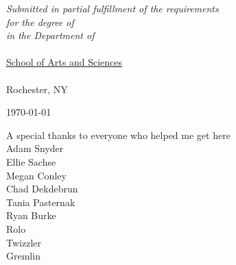\documentclass[
11pt, %
english, %
doublespacing, %
nolistspacing, %
headsepline, %
]{MastersDoctoralThesis} %
\begin{document}
\begin{titlepage}
\begin{singlespace}
\begin{center}
\vfill

\large \textit{Submitted in partial fulfillment of the requirements\\ for the degree of \degreename}\\[0.3cm] %
\textit{in the Department of}\\[0.4cm]
\deptname\\{\href{https://www.sas.rochester.edu/}{School of Arts and Sciences}}\\\univname\\{Rochester, NY} %
 
\vfill

{\large \today}\\[4cm] %

 
\vfill
\end{center}
\end{singlespace}
\end{titlepage}






{
\hypersetup{hidelinks}
\tableofcontents %
}






\begin{acknowledgements}
	A special thanks to everyone who helped me get here\\
	Adam Snyder \\
	Ellie Sachse \\
	Megan Conley \\
	Chad Dekdebrun \\
	Tania Pasternak \\
	Ryan Burke \\
	Rolo \\
	Twizzler \\
	Gremlin \\
\end{acknowledgements}
\end{document}
